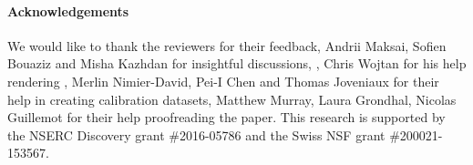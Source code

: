 
\paragraph{Acknowledgements}
\begin{draft}
We would like to thank the reviewers for their feedback, Andrii Maksai, Sofien Bouaziz and Misha Kazhdan for insightful discussions, , Chris Wojtan for his help rendering , Merlin Nimier-David, Pei-I Chen and Thomas Joveniaux for their help in creating calibration datasets, Matthew Murray, Laura Grondhal, Nicolas Guillemot for their help proofreading the paper. 
% 
This research is supported by the NSERC Discovery grant \#2016-05786 and the Swiss NSF grant \#200021-153567.
\end{draft}